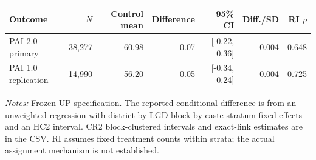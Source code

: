 \begin{tabular}{lrrrrrr}
\toprule
Outcome & $N$ & Control mean & Difference & 95\% CI & Diff./SD & RI $p$ \\
\midrule
PAI 2.0 primary & 38,277 & 60.98 & 0.07 & [-0.22, 0.36] & 0.004 & 0.648 \\
PAI 1.0 replication & 14,990 & 56.20 & -0.05 & [-0.34, 0.24] & -0.004 & 0.725 \\
\bottomrule
\end{tabular}
\parbox{\linewidth}{\scriptsize \emph{Notes:} Frozen UP specification. The reported conditional difference is from an unweighted regression with district by LGD block by caste stratum fixed effects and an HC2 interval. CR2 block-clustered intervals and exact-link estimates are in the CSV. RI assumes fixed treatment counts within strata; the actual assignment mechanism is not established.}
